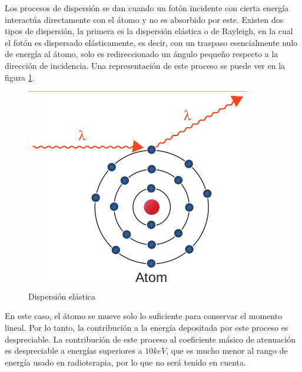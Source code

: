 Los procesos de dispersión se dan cuando un fotón incidente con cierta energía interactúa directamente con el átomo y no es absorbido por este. Existen dos tipos de dispersión, la primera es la dispersión elástica o de Rayleigh, en la cual el fotón es dispersado elásticamente, es decir, con un traspaso esencialmente nulo de energía al átomo, solo es redireccionado un ángulo pequeño respecto a la dirección de incidencia. Una representación de este proceso se puede ver en la figura \ref{fig:rayleigh}.\\
\begin{figure}[H]
	\centering
	\includegraphics[width=0.7\linewidth]{images/rayleigh.png}
	\caption{Dispersión elástica}
	\label{fig:rayleigh}
\end{figure}
En este caso, el átomo se mueve solo lo suficiente para conservar el momento lineal. Por lo tanto, la contribución a la energía depositada por este proceso es despreciable. La contribución de este proceso al coeficiente másico de atenuación es despreciable a energías superiores a $10keV$, que es mucho menor al rango de energía usado en radioterapia, por lo que no será tenido en cuenta.  \\

